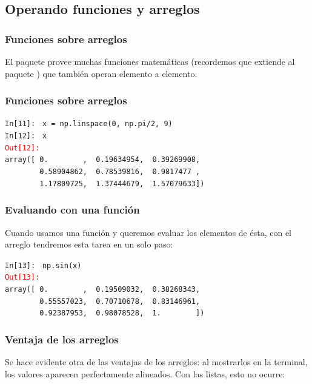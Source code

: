 \subsection{Operando funciones y arreglos}
\begin{frame}[fragile]
\frametitle{Funciones sobre arreglos}
El paquete  provee muchas funciones matemáticas (recordemos que extiende al paquete ) que también operan elemento a elemento.
\end{frame}
\begin{frame}[fragile]
\frametitle{Funciones sobre arreglos}
\begin{tcolorbox}[colback=aquamarine!30!white, colbacktitle=kellygreen, coltitle=white, fonttitle=\small, title=Definiendo un arreglo con linspace]
\fontsize{10}{10}\selectfont
\textcolor{ao}{\texttt{In[11]: }} \texttt{x = np.linspace(0, np.pi/2, 9)} \\
\medskip
\pause
\textcolor{ao}{\texttt{In[12]: }} \texttt{x}
\\
\bigskip
\pause
\textcolor{red}{\texttt{Out[12]: }} \\
\verb|array([ 0.        ,  0.19634954,  0.39269908,| \\
\verb|        0.58904862,  0.78539816,  0.9817477 ,| \\
\verb|        1.17809725,  1.37444679,  1.57079633])|
\end{tcolorbox}
\end{frame}
\begin{frame}[fragile]
\frametitle{Evaluando con una función}
Cuando usamos una función y queremos evaluar los elementos de ésta, con el arreglo tendremos esta tarea en un solo paso:
\begin{tcolorbox}[colback=aquamarine!30!white, colbacktitle=kellygreen, coltitle=white, fonttitle=\small, title=Evaluando una función con un arreglo]
\fontsize{10}{10}\selectfont
\textcolor{ao}{\texttt{In[13]: }} \texttt{np.sin(x)} \\
\medskip
\pause
\textcolor{red}{\texttt{Out[13]: }} \\
\verb|array([ 0.        ,  0.19509032,  0.38268343,| \\
\verb|        0.55557023,  0.70710678,  0.83146961,| \\
\verb|        0.92387953,  0.98078528,  1.        ])|
\end{tcolorbox}
\end{frame}
\begin{frame}[fragile]
\frametitle{Ventaja de los arreglos}
Se hace evidente otra de las ventajas de los arreglos: al mostrarlos en la terminal, los valores aparecen perfectamente alineados. Con las listas, esto no ocurre:
\end{frame}
